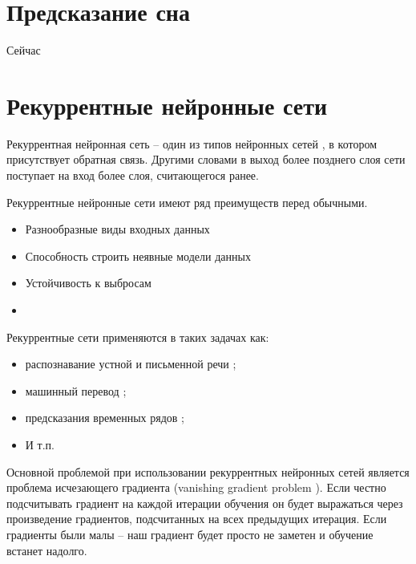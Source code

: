 \section{Предсказание сна}
Сейчас 
\section{Рекуррентные нейронные сети}
Рекуррентная нейронная сеть – один из типов нейронных сетей \cite{neural_network}, в котором присутствует обратная связь. Другими словами в выход более позднего слоя сети поступает на вход более слоя, считающегося ранее.

Рекуррентные нейронные сети имеют ряд преимуществ перед обычными.
\begin{itemize}
	\item Разнообразные виды входных данных
	\item Способность строить неявные модели данных
	\item Устойчивость к выбросам
	\item 
\end{itemize}

Рекуррентные сети применяются в таких задачах как:
\begin{itemize}
	\item распознавание устной и письменной речи \cite{rnn_for_speech_recognition, rnn_for_text_recognition};
	\item машинный перевод \cite{rnn_for_translation};
	\item предсказания временных рядов \cite{rnn_for_prediction};
	\item И т.п.
\end{itemize}



Основной проблемой при использовании рекуррентных нейронных сетей является проблема исчезающего градиента (vanishing gradient problem \cite{vanishing_gradient_problem}). Если честно подсчитывать градиент на каждой итерации обучения он будет выражаться через произведение градиентов, подсчитанных на всех предыдущих итерация. Если градиенты были малы – наш градиент будет просто не заметен и обучение встанет надолго. 

